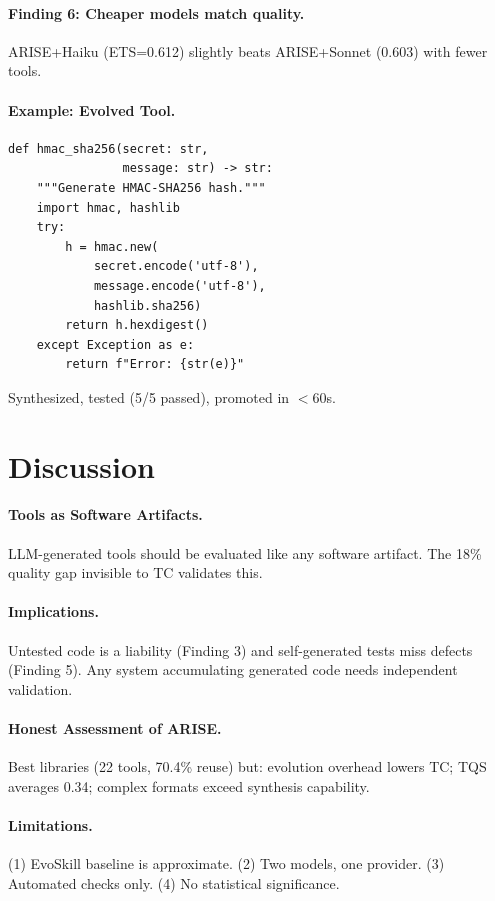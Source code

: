 \documentclass[10pt,twocolumn]{article}
\begin{document}
\paragraph{Finding 6: Cheaper models match quality.} ARISE+Haiku (ETS=0.612) slightly beats ARISE+Sonnet (0.603) with fewer tools.

\paragraph{Example: Evolved Tool.}
\begin{lstlisting}
def hmac_sha256(secret: str,
                message: str) -> str:
    """Generate HMAC-SHA256 hash."""
    import hmac, hashlib
    try:
        h = hmac.new(
            secret.encode('utf-8'),
            message.encode('utf-8'),
            hashlib.sha256)
        return h.hexdigest()
    except Exception as e:
        return f"Error: {str(e)}"
\end{lstlisting}
Synthesized, tested (5/5 passed), promoted in $<$60s.

\section{Discussion}

\paragraph{Tools as Software Artifacts.} LLM-generated tools should be evaluated like any software artifact. The 18\% quality gap invisible to TC validates this.

\paragraph{Implications.} Untested code is a liability (Finding 3) and self-generated tests miss defects (Finding 5). Any system accumulating generated code needs independent validation.

\paragraph{Honest Assessment of ARISE.} Best libraries (22 tools, 70.4\% reuse) but: evolution overhead lowers TC; TQS averages 0.34; complex formats exceed synthesis capability.

\paragraph{Limitations.} (1) EvoSkill baseline is approximate. (2) Two models, one provider. (3) Automated checks only. (4) No statistical significance.
\end{document}
